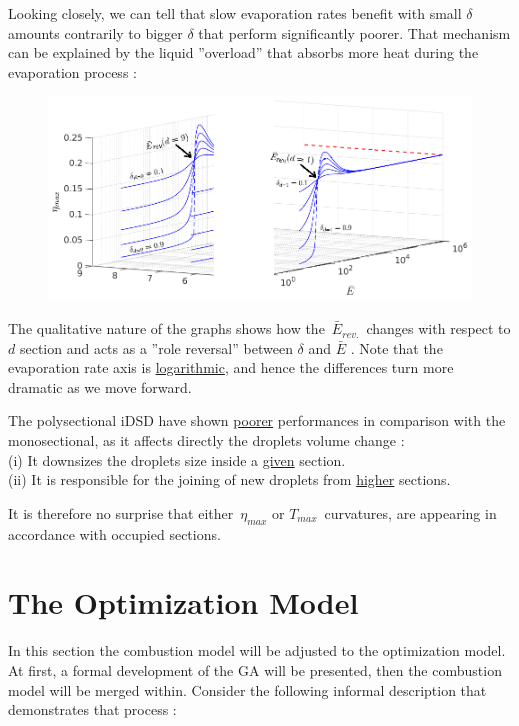 \documentclass[12pt]{article}
\numberwithin{equation}{section}
\begin{document}
\begin{flushleft}
Looking closely, we can tell that slow evaporation rates benefit with small $\delta$ amounts contrarily to bigger  $\delta$ that perform significantly poorer. That mechanism can be explained by the liquid ”overload” that absorbs more heat during the evaporation process : %
\begin{figure}[H] 
\centering
\includegraphics[width=1.0 \linewidth, center]{p_dist_mono_explanation.png}
\end{figure}

The qualitative nature of the graphs shows how the \,$\bar{E}_{rev.}$\, changes with respect to $d$ section and acts as a ”role reversal” between $\delta$ and $\bar{E}$ . Note that the evaporation rate axis is \underline{logarithmic}, and hence the differences turn more dramatic as we move forward.

The polysectional iDSD have shown \underline{poorer} performances in comparison with the monosectional, as it affects directly the droplets volume change : \\
\quad (i) \hspace{1mm}It downsizes the droplets size inside a \underline{given} section. \\
\quad (ii) It is responsible for the joining of new droplets from \underline{higher} sections.

It is therefore no surprise that either \,$\eta_{max}$ or $T_{max}$\, curvatures, are appearing in accordance with occupied sections.

\newpage

\section{The Optimization Model}
In this section the combustion model will be adjusted to the optimization model. At first, a formal development of the GA will be presented, then the combustion model will be merged within. Consider the following informal description that demonstrates that process : \vspace{.2cm}


\end{flushleft}
\end{document}
